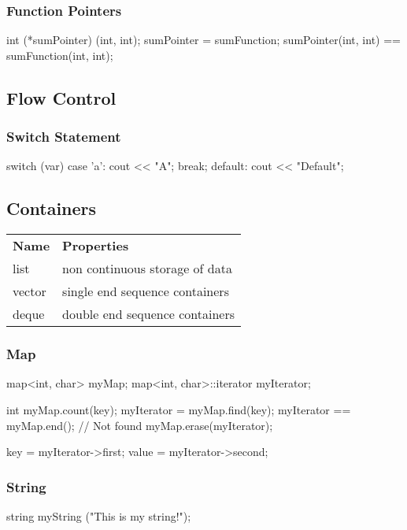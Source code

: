 \documentclass[10pt,a4paper]{extarticle}
\begin{document}
\begin{multicols}{2}
\subsubsection*{Function Pointers}
\begin{cppcode}
  int (*sumPointer) (int, int);
  sumPointer = sumFunction;
  sumPointer(int, int) == sumFunction(int, int);
\end{cppcode}

\subsection*{Flow Control}

\subsubsection*{Switch Statement}
\begin{cppcode}
  switch (var){
  case 'a':
    cout << "A";
    break;
  default:
    cout << "Default";
  }
\end{cppcode}


\subsection*{Containers}

\begin{tabular}{ll}
\textbf{Name} \hspace{0.6cm} & \textbf{Properties} \\
list & non continuous storage of data \\
vector & single end sequence containers \\
deque & double end sequence containers \\
\end{tabular}

\subsubsection*{Map}
\begin{cppcode}
  map<int, char> myMap;
  map<int, char>::iterator myIterator;

  int myMap.count(key);
  myIterator = myMap.find(key);
  myIterator == myMap.end();    // Not found
  myMap.erase(myIterator);

  key = myIterator->first;
  value = myIterator->second;
\end{cppcode}

\subsubsection*{String}
\begin{cppcode}
  string myString ("This is my string!");


\end{cppcode}
\end{multicols}
\end{document}
